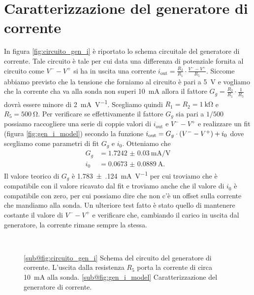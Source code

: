 \documentclass[
    prl,
    reprint, 
    superscriptaddress, 
    altaffilletter, 
    amsmath, 
    amssymb, 
    a4paper,
    varvw]{revtex4-2}
\begin{document}

\appendix
\section{Caratterizzazione del generatore di corrente}\label{sec:appendix_current_gen}

In figura \ref{fig:circuito_gen_i} è riportato lo schema circuitale del generatore di corrente. Tale circuito è tale per cui data una differenza di potenziale fornita al circuito come $V^{-}-V^{+}$ si ha in uscita una corrente $i_\text{out}=\frac{R_2}{R_1}\cdot \frac{V^--V^+}{R_5}$. Siccome abbiamo previsto che la tensione che forniamo al circuito è pari a \SI{5}{\volt} e vogliamo che la corrente cha va alla sonda non superi \SI{10}{\milli\ampere} allora il fattore $G_g=\frac{R_2}{R_1}\cdot\frac{1}{R_5}$ dovrà essere minore di \SI{2}{\milli\ampere\per\volt}. Scegliamo quindi $R_{1}=R_{2}=\SI{1}{\kilo\ohm}$ e $R_{5}=\SI{500}{\ohm}$. Per verificare se effettivamente il fattore $G_g$ sia pari a $1/500$ possiamo raccogliere una serie di coppie valori di $i_\text{out}$ e $V^{-}-V^{+}$ e realizzare un fit (figura \ref{fig:gen_i_model}) secondo la funzione $i_\text{out}=G_g\cdot \qty(V^--V^+) + i_0$ dove scegliamo come parametri di fit $G_{g}$ e $i_0$. Otteniamo che 
\begin{align*}
    G_g &=\SI{1.7242(300)}{\milli\ampere \per\volt}\\
    i_0 &= \SI{0.0673(889)}{\ampere}.
\end{align*}
Il valore teorico di $G_g$ è \SI{1.783(124)}{\milli\ampere\per\volt} per cui troviamo che è compatibile con il valore ricavato dal fit e troviamo anche che il valore di $i_0$ è compatibile con zero, per cui possiamo dire che non c'è un offset sulla corrente che mandiamo alla sonda.
Un ulteriore test fatto è stato quello di mantenere costante il valore di $V^--V^+$ e verificare che, cambiando il carico in uscita dal generatore, la corrente rimane sempre la stessa.

\begin{figure}
    \centering
    \\
    \caption{
        \ref{sub@fig:circuito_gen_i} Schema del circuito del generatore di corrente. L'uscita dalla resistenza $R_5$ porta la corrente di circa \SI{10}{\milli\ampere} alla sonda.
        \ref{sub@fig:gen_i_model} Caratterizzazione del generatore di corrente. 
    }
\end{figure}
\end{document}
